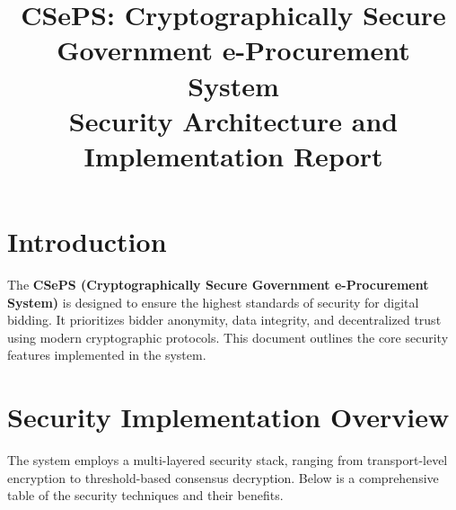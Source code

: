 \documentclass[12pt,a4paper]{article}
\title{
    \vspace{2cm}
    \textbf{\huge CSePS: Cryptographically Secure Government e-Procurement System} \\
    \vspace{1cm}
    \large Security Architecture and Implementation Report \\
    \vspace{0.5cm}
}
\begin{document}
\section{Introduction}
The \textbf{CSePS (Cryptographically Secure Government e-Procurement System)} is designed to ensure the highest standards of security for digital bidding. It prioritizes bidder anonymity, data integrity, and decentralized trust using modern cryptographic protocols. This document outlines the core security features implemented in the system.

\section{Security Implementation Overview}
The system employs a multi-layered security stack, ranging from transport-level encryption to threshold-based consensus decryption. Below is a comprehensive table of the security techniques and their benefits.
\end{document}
